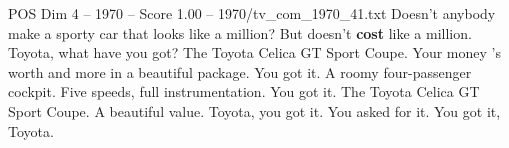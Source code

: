 \begin{textsample}{POS Dim 4 – 1970 – Score 1.00 – 1970/tv\_com\_1970\_41.txt}  \label{ex:f4_pos_039}
Doesn't anybody make a sporty car that looks like a million?
But doesn't \textbf{cost} like a million.
Toyota, what have you got?
The Toyota Celica GT Sport Coupe.
Your money 's worth and more in a beautiful package.
You got it.
A roomy four-passenger cockpit.
Five speeds, full instrumentation.
You got it.
The Toyota Celica GT Sport Coupe.
A beautiful value.
Toyota, you got it.
You asked for it.
You got it, Toyota.

\end{textsample}
